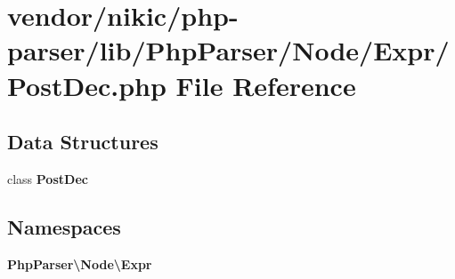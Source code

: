 \section{vendor/nikic/php-\/parser/lib/\+Php\+Parser/\+Node/\+Expr/\+Post\+Dec.php File Reference}
\label{_post_dec_8php}
\subsection*{Data Structures}
\begin{DoxyCompactItemize}
\item 
class {\bf Post\+Dec}
\end{DoxyCompactItemize}
\subsection*{Namespaces}
\begin{DoxyCompactItemize}
\item 
 {\bf Php\+Parser\textbackslash{}\+Node\textbackslash{}\+Expr}
\end{DoxyCompactItemize}
